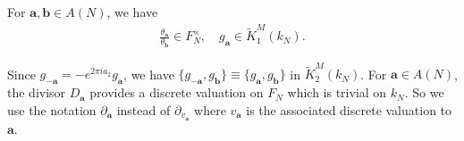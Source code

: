 \documentclass[12pt,amstex,amssymb]{article}
\theoremstyle{plain}
\theoremstyle{definition}
\def\cE{{\cal E}}
\def\cR{{\cal R}}
\def\cK{{\cal K}}
\def\cM{{\cal M}}
\def\Z{{\mathbb Z}}
\def\C{{\mathbb C}}
\def\Q{{\mathbb Q}}
\newcommand{\be}{\begin{eqnarray*}}
\newcommand{\ee}{\end{eqnarray*}}
\newcommand{\Res}{\operatorname{Res}}
\newcommand{\ba}{\mathbf{a}}
\newcommand{\bb}{\mathbf{b}}
\newcommand{\tfH}{\tilde{\mathfrak{H}}}
\begin{document}
For $\ba, \bb \in A(N)$, we have
\be
\frac{\theta_{\ba}}{\theta_\bb} \in F_N^\times,  \quad
g_{\ba} \in \tilde K^M_1(k_N).
\ee



Since $g_{-\ba}=-e^{2 \pi i a_2} g_{\ba}$, we have $\{g_{-\ba}, g_{\bb}\}\equiv \{g_{\ba}, g_{\bb}\}$ in $\tilde K^M_2(k_N)$.
For $\ba \in A(N)$, the divisor
$D_\ba$
provides a discrete valuation on $F_N$ which is trivial on $k_N$. So we use the notation $\partial_\ba$ instead of $\partial_{v_\ba}$ where $v_\ba$ is the associated discrete valuation to $\ba$.
\end{document}
